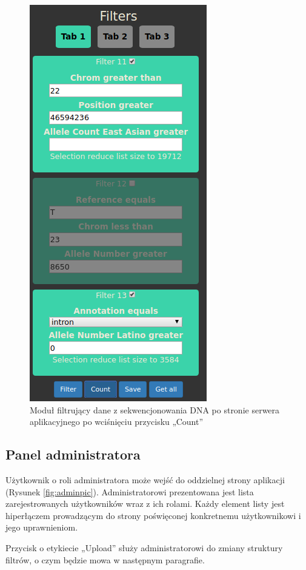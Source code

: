 \documentclass[a4paper,12pt,twoside]{article}
\begin{document}
\begin{figure}[H]
\centering
\includegraphics[height=0.9\textheight]{obrazy/aplikacja/count.png}
\caption{Moduł filtrujący dane z sekwencjonowania DNA po stronie serwera aplikacyjnego po wciśnięciu przycisku „Count”}
\label{fig:countpic}
\end{figure}

\subsection{Panel administratora}
Użytkownik o roli administratora może wejść do oddzielnej strony aplikacji (Rysunek \ref{fig:adminpic}). Administratorowi prezentowana jest lista zarejestrowanych użytkowników wraz z ich rolami. Każdy element listy jest hiperłączem prowadzącym
do strony poświęconej konkretnemu użytkownikowi i jego uprawnieniom.

Przycisk o etykiecie „Upload” służy administratorowi do zmiany struktury
filtrów, o czym będzie mowa w następnym paragrafie.
\end{document}
